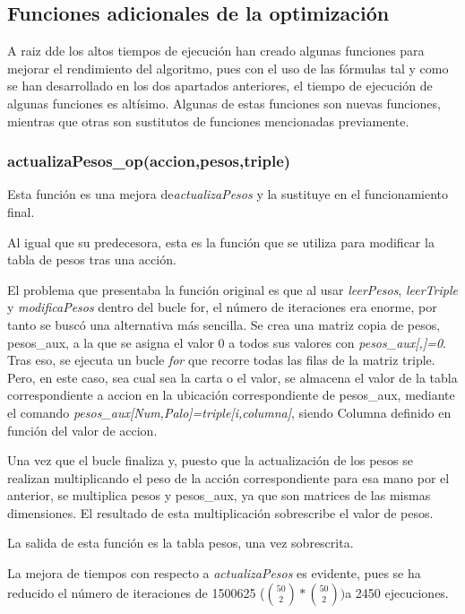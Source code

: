 \subsection{Funciones adicionales de la optimización}

A raiz dde los altos tiempos de ejecución han creado algunas funciones para mejorar el rendimiento del algoritmo, pues con el uso de las fórmulas tal y como se han desarrollado en los dos apartados anteriores, el tiempo de ejecución de algunas funciones es altísimo. Algunas de estas funciones son nuevas funciones, mientras que otras son sustitutos de funciones mencionadas previamente.

\subsubsection{actualizaPesos\_op(accion,pesos,triple)}

Esta función es una mejora de\textit{actualizaPesos} y la sustituye en el funcionamiento final.

Al igual que su predecesora, esta es la función que se utiliza para modificar la tabla de pesos tras una acción. 

El problema que presentaba la función original es que al usar \textit{leerPesos}, \textit{leerTriple} y \textit{modificaPesos} dentro del bucle for, el número de iteraciones era enorme, por tanto se buscó una alternativa más sencilla.
Se crea una matriz copia de pesos, pesos\_aux, a la que se asigna el valor 0 a todos sus valores con \textit{pesos\_aux[,]=0}. Tras eso, se ejecuta un bucle \textit{for} que recorre todas las filas de la matriz triple. Pero, en este caso, sea cual sea la carta o el valor, se almacena el valor de la tabla correspondiente a accion en la ubicación correspondiente de pesos\_aux, mediante el comando \textit{pesos\_aux[Num,Palo]=triple[i,columna]}, siendo Columna definido en función del valor de accion.

Una vez que el bucle finaliza y, puesto que la actualización de los pesos se realizan multiplicando el peso de la acción correspondiente para esa mano por el anterior, se multiplica pesos y pesos\_aux, ya que son matrices de las mismas dimensiones. El resultado de esta multiplicación sobrescribe el valor de pesos.

La salida de esta función es la tabla pesos, una vez sobrescrita.

La mejora de tiempos con respecto a \textit{actualizaPesos} es evidente, pues se ha reducido el número de iteraciones de 1500625 ($\binom{50}{2}*\binom{50}{2}) $a 2450 ejecuciones.

